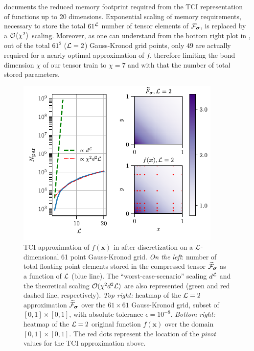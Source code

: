 \begin{example}
 documents the reduced memory footprint required from the TCI representation of functions up to 20 dimensions. Exponential scaling of memory requirements, necessary to store the total $61^{\mathcal{L}}$ number of tensor elements of $\mathcal{F}_{\boldsymbol{\sigma}}$, is replaced by a $\mathcal{O} \bigl(\chi^2\bigr)$ scaling. Moreover, as one can understand from the bottom right plot in , out of the total $61^2$ ($\mathcal{L}=2$) Gauss-Kronod grid points, only $49$ are actually required for a nearly optimal approximation of $f$, therefore limiting the bond dimension $\chi$ of our tensor train to $\chi = 7$ and with that the number of total stored parameters. 
\begin{figure}[ht!]
		\centering
		\includegraphics[width=0.9\textwidth]{figures/TCI_memory_scaling+heatmap.pdf}
		\caption{TCI approximation of $f(\boldsymbol{x})$ in  after discretization on a $\mathcal{L}$-dimensional 61 point Gauss-Kronod grid. \textit{On the left}: number of total floating point elements stored in the compressed tensor $\widetilde{\mathcal{F}}_{\boldsymbol{\sigma}}$ as a function of $\mathcal{L}$ (blue line). The ``worst-case-scenario'' scaling $d^{\mathcal{L}}$ and the theoretical scaling $\mathcal{O} (\chi^2d^2\mathcal{L})$ are also represented (green and red dashed line, respectively). \textit{Top right:} heatmap of the $\mathcal{L} = 2$ approximation $\widetilde{\mathcal{F}}_{\boldsymbol{\sigma}}$ over the $61\times61$ Gauss-Kronod grid, subset of $[0,1]\times[0,1]$, with absolute tolerance $\epsilon = 10^{-8}$. \textit{Bottom right:} heatmap of the $\mathcal{L} = 2$ original function  $f(\boldsymbol{x})$ over the domain $[0,1]\times[0,1]$. The red dots represent the location of the \textit{pivot} values for the TCI approximation above.
		}
		\label{fig:TCIscaling}
	\end{figure}
\label{ex:Ldimfunc}
\end{example}

